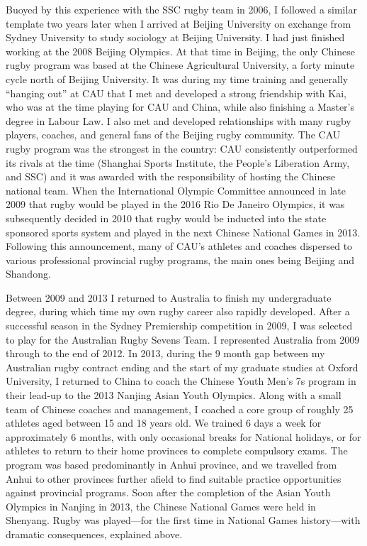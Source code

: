 {Buoyed by this experience with the SSC rugby team in 2006, I followed a similar template two years later when I arrived at Beijing University on exchange from Sydney University to study sociology at Beijing University.  I had just finished working at the 2008 Beijing Olympics. At that time in Beijing, the only Chinese rugby program was based at the Chinese Agricultural University, a forty minute cycle north of Beijing University.  It was during my time training and generally ``hanging out'' at CAU that I met and developed a strong friendship with Kai, who was at the time playing for CAU and China, while also finishing a Master's degree in Labour Law.  I also met and developed relationships with many rugby players, coaches, and general fans of the Beijing rugby community.  The CAU rugby program was the strongest in the country: CAU consistently outperformed its rivals at the time (Shanghai Sports Institute, the People's Liberation Army, and SSC) and it was awarded with the responsibility of hosting the Chinese national team.  When the International Olympic Committee announced in late 2009 that rugby would be played in the 2016 Rio De Janeiro Olympics, it was subsequently decided in 2010 that rugby would be inducted into the state sponsored sports system and played in the next Chinese National Games in 2013.  Following this announcement, many of CAU's athletes and coaches dispersed to various professional provincial rugby programs, the main ones being Beijing and Shandong.

Between 2009 and 2013 I returned to Australia to finish my undergraduate degree, during which time my own rugby career also rapidly developed.  After a successful season in the Sydney Premiership competition in 2009, I was selected to play for the Australian Rugby Sevens Team. I represented Australia from 2009 through to the end of 2012.  In 2013, during the 9 month gap between my Australian rugby contract ending and the start of my graduate studies at Oxford University, I returned to China to coach the Chinese Youth Men's 7s program in their lead-up to the 2013 Nanjing Asian Youth Olympics.  Along with a small team of Chinese coaches and management, I coached a core group of roughly 25 athletes aged between 15 and 18 years old. We trained 6 days a week for approximately 6 months, with only occasional breaks for National holidays, or for athletes to return to their home provinces to complete compulsory exams.  The program was based predominantly in Anhui province, and we travelled from Anhui to other provinces further afield to find suitable practice opportunities against provincial programs.  Soon after the completion of the Asian Youth Olympics in Nanjing in 2013, the Chinese National Games were held in Shenyang. Rugby was played---for the first time in National Games history---with dramatic consequences, explained above.


}
